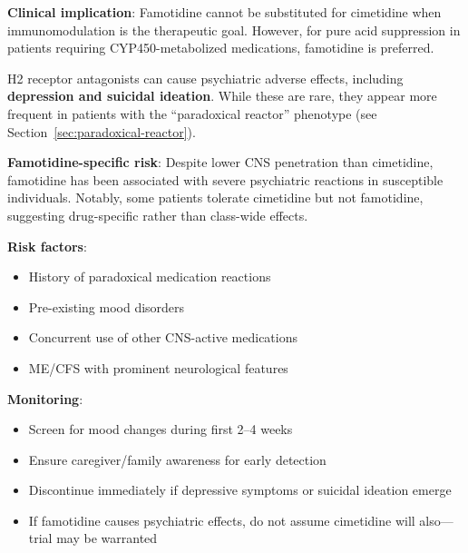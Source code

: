 \textbf{Clinical implication}: Famotidine cannot be substituted for cimetidine when immunomodulation is the therapeutic goal. However, for pure acid suppression in patients requiring CYP450-metabolized medications, famotidine is preferred.

\begin{warning}
\label{warn:h2-psychiatric}
H2 receptor antagonists can cause psychiatric adverse effects, including \textbf{depression and suicidal ideation}. While these are rare, they appear more frequent in patients with the ``paradoxical reactor'' phenotype (see Section~\ref{sec:paradoxical-reactor}).

\textbf{Famotidine-specific risk}: Despite lower CNS penetration than cimetidine, famotidine has been associated with severe psychiatric reactions in susceptible individuals. Notably, some patients tolerate cimetidine but not famotidine, suggesting drug-specific rather than class-wide effects.

\textbf{Risk factors}:
\begin{itemize}
    \item History of paradoxical medication reactions
    \item Pre-existing mood disorders
    \item Concurrent use of other CNS-active medications
    \item ME/CFS with prominent neurological features
\end{itemize}

\textbf{Monitoring}:
\begin{itemize}
    \item Screen for mood changes during first 2--4 weeks
    \item Ensure caregiver/family awareness for early detection
    \item Discontinue immediately if depressive symptoms or suicidal ideation emerge
    \item If famotidine causes psychiatric effects, do not assume cimetidine will also---trial may be warranted
\end{itemize}
\end{warning}


